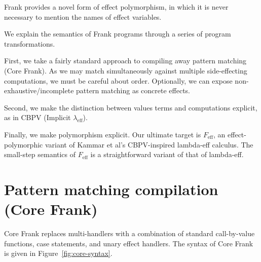 \documentclass[preprint]{sigplanconf}
\newcommand{\lameff}{$\lambda_\mathrm{eff}$\xspace}
\newcommand{\feff}{$F_\textrm{eff}$\xspace}
\newcommand{\impeff}{Implicit \lameff}
\begin{document}
Frank provides a novel form of effect polymorphism, in which it is
never necessary to mention the names of effect variables.

We explain the semantics of Frank programs through a series of program
transformations.

First, we take a fairly standard approach to compiling away pattern
matching (Core Frank). As we may match simultaneously against multiple
side-effecting computations, we must be careful about
order. Optionally, we can expose non-exhaustive/incomplete pattern
matching as concrete effects.

Second, we make the distinction between values terms and computations
explicit, as in CBPV (\impeff).

Finally, we make polymorphism explicit. Our ultimate target is \feff,
an effect-polymorphic variant of Kammar et al's CBPV-inspired
lambda-eff calculus. The small-step semantics of \feff is a
straightforward variant of that of lambda-eff.


\section{Pattern matching compilation (Core Frank)}
\label{sec:core}


Core Frank replaces multi-handlers with a combination of standard
call-by-value functions, case statements, and unary effect handlers.
The syntax of Core Frank is given in Figure~\ref{fig:core-syntax}.
\end{document}
